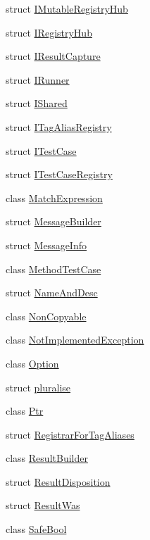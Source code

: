 \begin{DoxyCompactItemize}
\item 
struct \hyperlink{struct_catch_1_1_i_mutable_registry_hub}{I\+Mutable\+Registry\+Hub}
\item 
struct \hyperlink{struct_catch_1_1_i_registry_hub}{I\+Registry\+Hub}
\item 
struct \hyperlink{struct_catch_1_1_i_result_capture}{I\+Result\+Capture}
\item 
struct \hyperlink{struct_catch_1_1_i_runner}{I\+Runner}
\item 
struct \hyperlink{struct_catch_1_1_i_shared}{I\+Shared}
\item 
struct \hyperlink{struct_catch_1_1_i_tag_alias_registry}{I\+Tag\+Alias\+Registry}
\item 
struct \hyperlink{struct_catch_1_1_i_test_case}{I\+Test\+Case}
\item 
struct \hyperlink{struct_catch_1_1_i_test_case_registry}{I\+Test\+Case\+Registry}
\item 
class \hyperlink{class_catch_1_1_match_expression}{Match\+Expression}
\item 
struct \hyperlink{struct_catch_1_1_message_builder}{Message\+Builder}
\item 
struct \hyperlink{struct_catch_1_1_message_info}{Message\+Info}
\item 
class \hyperlink{class_catch_1_1_method_test_case}{Method\+Test\+Case}
\item 
struct \hyperlink{struct_catch_1_1_name_and_desc}{Name\+And\+Desc}
\item 
class \hyperlink{class_catch_1_1_non_copyable}{Non\+Copyable}
\item 
class \hyperlink{class_catch_1_1_not_implemented_exception}{Not\+Implemented\+Exception}
\item 
class \hyperlink{class_catch_1_1_option}{Option}
\item 
struct \hyperlink{struct_catch_1_1pluralise}{pluralise}
\item 
class \hyperlink{class_catch_1_1_ptr}{Ptr}
\item 
struct \hyperlink{struct_catch_1_1_registrar_for_tag_aliases}{Registrar\+For\+Tag\+Aliases}
\item 
class \hyperlink{class_catch_1_1_result_builder}{Result\+Builder}
\item 
struct \hyperlink{struct_catch_1_1_result_disposition}{Result\+Disposition}
\item 
struct \hyperlink{struct_catch_1_1_result_was}{Result\+Was}
\item 
class \hyperlink{class_catch_1_1_safe_bool}{Safe\+Bool}

\end{DoxyCompactItemize}

